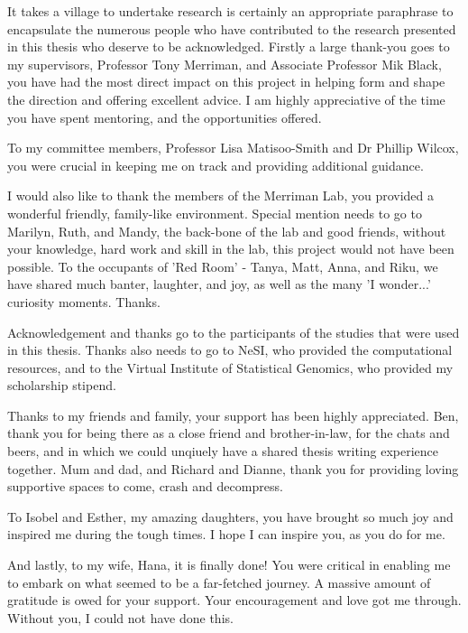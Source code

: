 
It takes a village to undertake research is certainly an appropriate paraphrase to encapsulate the numerous people who have contributed to the research presented in this thesis who deserve to be acknowledged. Firstly a large thank-you goes to my supervisors, Professor Tony Merriman, and Associate Professor Mik Black, you have had the most direct impact on this project in helping form and shape the direction and offering excellent advice. I am highly appreciative of the time you have spent mentoring, and the opportunities offered.

To my committee members, Professor Lisa Matisoo-Smith and Dr Phillip Wilcox, you were crucial in keeping me on track and providing additional guidance.

I would also like to thank the members of the Merriman Lab, you provided a wonderful friendly, family-like environment. Special mention needs to go to Marilyn, Ruth, and Mandy, the back-bone of the lab and good friends, without your knowledge, hard work and skill in the lab, this project would not have been possible. To the occupants of 'Red Room' - Tanya, Matt, Anna, and Riku, we have shared much banter, laughter, and joy, as well as the many 'I wonder...' curiosity moments. Thanks.

Acknowledgement and thanks go to the participants of the studies that were used in this thesis. Thanks also needs to go to NeSI, who provided the computational resources, and to the Virtual Institute of Statistical Genomics, who provided my scholarship stipend.

Thanks to my friends and family, your support has been highly appreciated. Ben, thank you for being there as a close friend and brother-in-law, for the chats and beers, and in which we could unqiuely have a shared thesis writing experience together. Mum and dad, and Richard and Dianne, thank you for providing loving supportive spaces to come, crash and decompress.

To Isobel and Esther, my amazing daughters, you have brought so much joy and inspired me during the tough times. I hope I can inspire you, as you do for me.

And lastly, to my wife, Hana, it is finally done! You were critical in enabling me to embark on what seemed to be a far-fetched journey. A massive amount of gratitude is owed for your support. Your encouragement and love got me through. Without you, I could not have done this.